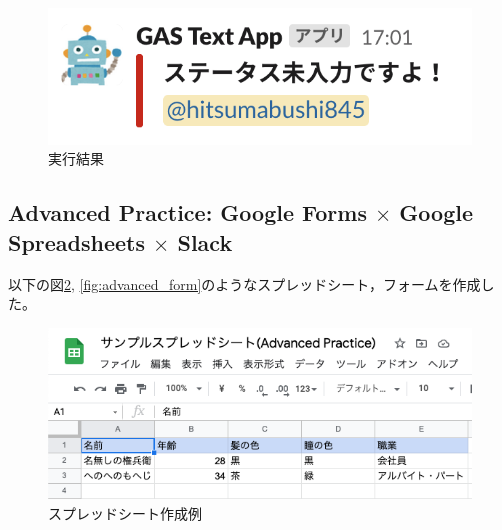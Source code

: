 \documentclass[uplatex,a4j]{jsarticle}
\begin{document}
\begin{figure}[H]
 \centering
 \includegraphics[keepaspectratio, scale=0.7]{images/spreadsheet_practice_exec_example.png}
 \caption{実行結果}
 \label{fig:spreadsheet_practice_exec_example}
\end{figure}

\subsection{Advanced Practice: Google Forms $\times$ Google Spreadsheets $\times$ Slack}

以下の図\ref{fig:advanced_spreadsheet}, \ref{fig:advanced_form}のようなスプレッドシート，フォームを作成した。

\begin{figure}[H]
 \centering
 \includegraphics[keepaspectratio, scale=0.7]{images/advanced_spreadsheet.png}
 \caption{スプレッドシート作成例}
 \label{fig:advanced_spreadsheet}
\end{figure}
\end{document}
